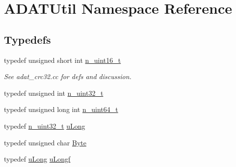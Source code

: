 \hypertarget{namespaceADATUtil}{}\section{A\+D\+A\+T\+Util Namespace Reference}
\label{namespaceADATUtil}
\subsection*{Typedefs}
\begin{DoxyCompactItemize}
\item 
typedef unsigned short int \mbox{\hyperlink{namespaceADATUtil_a8e184fda37156fed1e06319a0051e987}{n\+\_\+uint16\+\_\+t}}
\begin{DoxyCompactList}\small\item\em See adat\+\_\+crc32.\+cc for defs and discussion. \end{DoxyCompactList}\item 
typedef unsigned int \mbox{\hyperlink{namespaceADATUtil_ad945a8afa4db2d1f89b731964adae97e}{n\+\_\+uint32\+\_\+t}}
\item 
typedef unsigned long int \mbox{\hyperlink{namespaceADATUtil_afbd9ee3146133429698be74bcf422bd8}{n\+\_\+uint64\+\_\+t}}
\item 
typedef \mbox{\hyperlink{namespaceADATUtil_ad945a8afa4db2d1f89b731964adae97e}{n\+\_\+uint32\+\_\+t}} \mbox{\hyperlink{namespaceADATUtil_a51b60d81747dd992a62e9f1dea60fb13}{u\+Long}}
\item 
typedef unsigned char \mbox{\hyperlink{namespaceADATUtil_a420451c5593252de7271d104b24079b5}{Byte}}
\item 
typedef \mbox{\hyperlink{namespaceADATUtil_a51b60d81747dd992a62e9f1dea60fb13}{u\+Long}} \mbox{\hyperlink{namespaceADATUtil_adf7f8db2cc2f19fe6143cf8a2ad881f4}{u\+Longf}}
\end{DoxyCompactItemize}
